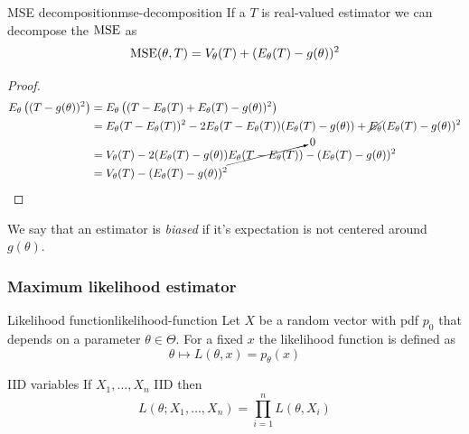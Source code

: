 \documentclass[12pt]{extarticle}
\begin{document}
\begin{proposition}{MSE decomposition}{mse-decomposition}
    If a $T$ is real-valued estimator we can decompose the $\MSE$ as
    \begin{equation}
        \MSE(\theta, T) = V_\theta(T) + (E_\theta(T) - g(\theta))^2
    \end{equation}
\end{proposition}
\begin{proof}
    \begin{align}
        E_\theta\left((T - g(\theta))^2\right) & = E_\theta\left((T -E_\theta(T) + E_\theta(T) - g(\theta))^2\right)                                                            \\
                                               & = E_\theta(T-E_\theta(T))^2 - 2E_\theta(T-E_\theta(T))(E_\theta(T) - g(\theta)) + \cancel{E_\theta}(E_\theta(T) - g(\theta))^2 \\
                                               & = V_\theta(T) - 2 (E_\theta(T) - g(\theta)) \cancelto{0}{E_\theta(T-E_\theta(T))} - (E_\theta(T) - g(\theta))^2                \\
                                               & = V_\theta(T) - (E_\theta(T) - g(\theta))^2
    \end{align}
\end{proof}

We say that an estimator is \emph{biased} if it's expectation is not centered around $g(\theta)$.

\subsubsection{Maximum likelihood estimator}

\begin{definition}{Likelihood function}{likelihood-function}
    Let $X$ be a random vector with pdf $p_0$ that depends on a parameter $\theta \in \Theta$.
    For a fixed $x$ the likelihood function is defined as
    \begin{equation}
        \theta \mapsto L(\theta, x) = p_\theta(x)
    \end{equation}
\end{definition}

\begin{lemma}{IID variables}{}
    If $X_1, \dots, X_n$ IID then
    \begin{equation}
        L(\theta; X_1, \dots, X_n) = \prod_{i = 1}^{n} L(\theta, X_i)
    \end{equation}
\end{lemma}
\end{document}

